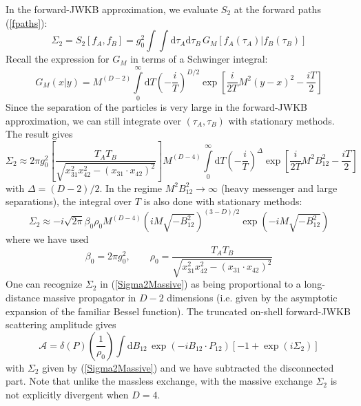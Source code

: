 In the forward-JWKB approximation, we evaluate $S_{2}$ at the forward paths (\ref{fpaths}):
\begin{equation}
	\Sigma_{2} = S_{2}[f_{A}, f_{B}] = g_{0}^{2} \int \int \mathrm{d}\tau_{A} \mathrm{d}\tau_{B} \, G_{M}[f_{A}(\tau_{A}) | f_{B}(\tau_{B})]
\end{equation}
Recall the expression for $G_{M}$ in terms of a Schwinger integral:
\begin{equation}
	G_{M}(x|y) = M^{(D-2)} \int\limits_{0}^{\infty} \mathrm{d}T \left( - \frac{i}{T} \right)^{D/2} \exp{\left[ \frac{i}{2 T} M^{2}(y - x)^{2} - \frac{i T}{2} \right]}
\end{equation}
Since the separation of the particles is very large in the forward-JWKB approximation, we can still integrate over $(\tau_{A}, \tau_{B})$ with stationary methods. The result gives
\begin{equation}
	\Sigma_{2} \approx 2 \pi g_{0}^{2} \left[ \frac{T_{A} T_{B}}{\sqrt{x_{31}^{2} x_{42}^{2} - (x_{31} \cdot x_{42})^{2}}} \right] M^{(D - 4)} \int\limits_{0}^{\infty} \mathrm{d}T \left( - \frac{i}{T} \right)^{\Delta} \exp{\left[ \frac{i}{2 T} M^{2}B_{12}^{2} - \frac{i T}{2} \right]}
\end{equation}
with $\Delta = (D - 2) / 2$. In the regime $M^{2} B_{12}^{2} \rightarrow \infty$ (heavy messenger and large separations), the integral over $T$ is also done with stationary methods:
\begin{equation}
	\Sigma_{2} \approx -i \sqrt{2 \pi} \beta_{0} \rho_{0} M^{(D - 4)} \left( i M \sqrt{-B_{12}^{2}} \right)^{(3 - D)/2} \exp{\left( -i M \sqrt{-B_{12}^{2}}\right)} \label{Sigma2Massive}
\end{equation}
where we have used
\begin{equation}
	\beta_{0} = 2 \pi g_{0}^{2}, \qquad \rho_{0} = \frac{T_{A} T_{B}}{\sqrt{x_{31}^{2} x_{42}^{2} - (x_{31} \cdot x_{42})^{2}}}
\end{equation}
One can recognize $\Sigma_{2}$ in (\ref{Sigma2Massive}) as being proportional to a long-distance massive propagator in $D-2$ dimensions (i.e. given by the asymptotic expansion of the familiar Bessel function). The truncated on-shell forward-JWKB scattering amplitude gives
\begin{equation}
	\mathcal{A} = \delta(P) \left( \frac{1}{\rho_{0}} \right) \int \mathrm{d}B_{1 2} \, \exp{\left( - i B_{1 2} \cdot P_{1 2} \right)} \left[-1 + \exp{\left(i \Sigma_{2}\right)} \right] \label{DAvarphi}
\end{equation}
with $\Sigma_{2}$ given by (\ref{Sigma2Massive}) and we have subtracted the disconnected part. Note that unlike the massless exchange, with the massive exchange $\Sigma_{2}$ is not explicitly divergent when $D = 4$.
